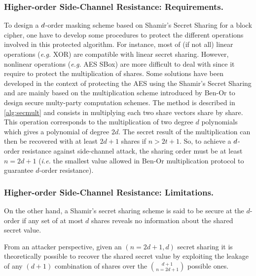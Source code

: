 \documentclass{llncs}
\begin{document}
\subsubsection{Higher-order Side-Channel Resistance: Requirements.} To design a $d$\myth-order masking scheme based on Shamir's Secret Sharing for a block cipher, one have to develop some procedures to protect the different operations involved in this protected algorithm. For instance, most of (if not all) linear operations (\emph{e.g.} XOR) are compatible with linear secret sharing. However, nonlinear operations (\emph{e.g.} AES SBox) are more difficult to deal with since it require to protect the multiplication of shares. Some solutions have been developed in the context of protecting the AES using the Shamir's Secret Sharing\cite{GM11,PR11,RP12} and are mainly based on the multiplication scheme introduced by
Ben-Or \etal to design secure multy-party computation schemes\cite{BGW88}.
The method is described in \ref{alg:secmult} and consists in multiplying each two share vectors share by share. This operation corresponds to the multiplication of two degree $d$ polynomials which gives a polynomial of degree $2d$. The secret result of the multiplication can then be recovered with at least $2d + 1$ shares if $n > 2t + 1$. 
So, to achieve a $d$\myth-order resistance against side-channel attack, the sharing order must be at least $n = 2d + 1$ (\emph{i.e.} the smallest value allowed in Ben-Or \etal multiplication protocol to guarantee $d$\myth-order resistance).

\subsubsection{Higher-order Side-Channel Resistance: Limitations.} On the other hand, a Shamir's secret sharing scheme is said to be secure at the $d$\myth-order if any set of at most $d$ shares reveals no information about the shared secret value. 

\begin{remark}
From an attacker perspective, given an $(n=2d+1,d)$ secret sharing it is theoretically possible to recover the shared secret value by exploiting the leakage of any $(d+1)$ combination of shares over the $d+1 \choose n=2d+1$ possible ones. 
\label{rmk:sca}
\end{remark}
\end{document}
